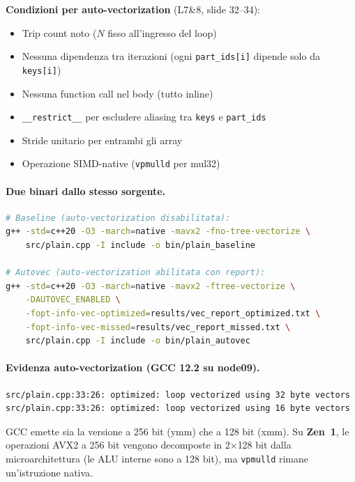 \documentclass[11pt,a4paper]{article}
\begin{document}
\textbf{Condizioni per auto-vectorization} (L7\&8, slide 32--34):
\begin{itemize}
    \item[\checkmark] Trip count noto ($N$ fisso all'ingresso del loop)
    \item[\checkmark] Nessuna dipendenza tra iterazioni (ogni \texttt{part\_ids[i]} dipende solo da \texttt{keys[i]})
    \item[\checkmark] Nessuna function call nel body (tutto inline)
    \item[\checkmark] \texttt{\_\_restrict\_\_} per escludere aliasing tra \texttt{keys} e \texttt{part\_ids}
    \item[\checkmark] Stride unitario per entrambi gli array
    \item[\checkmark] Operazione SIMD-native (\texttt{vpmulld} per mul32)
\end{itemize}

\paragraph{Due binari dallo stesso sorgente.}
\begin{lstlisting}[language=bash]
# Baseline (auto-vectorization disabilitata):
g++ -std=c++20 -O3 -march=native -mavx2 -fno-tree-vectorize \
    src/plain.cpp -I include -o bin/plain_baseline

# Autovec (auto-vectorization abilitata con report):
g++ -std=c++20 -O3 -march=native -mavx2 -ftree-vectorize \
    -DAUTOVEC_ENABLED \
    -fopt-info-vec-optimized=results/vec_report_optimized.txt \
    -fopt-info-vec-missed=results/vec_report_missed.txt \
    src/plain.cpp -I include -o bin/plain_autovec
\end{lstlisting}

\paragraph{Evidenza auto-vectorization (GCC 12.2 su node09).}
\begin{lstlisting}
src/plain.cpp:33:26: optimized: loop vectorized using 32 byte vectors
src/plain.cpp:33:26: optimized: loop vectorized using 16 byte vectors
\end{lstlisting}

GCC emette sia la versione a 256 bit (ymm) che a 128 bit (xmm). Su \textbf{Zen~1}, le operazioni AVX2 a 256 bit vengono decomposte in 2$\times$128 bit dalla microarchitettura (le ALU interne sono a 128 bit), ma \texttt{vpmulld} rimane un'istruzione nativa.
\end{document}
